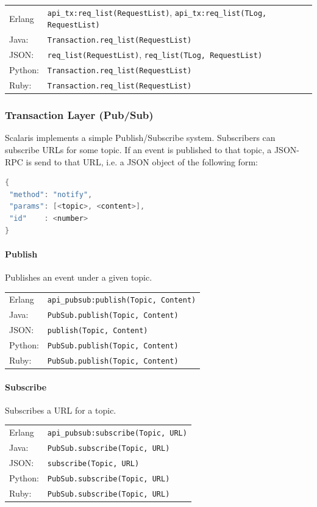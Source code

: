 \documentclass[a4paper]{scrreprt}
\newcommand{\code}[1]{\lstinline[basicstyle=\ttfamily]!#1!}
\begin{document}
\begin{tabular}{lp{14cm}}
Erlang  & \code{api_tx:req_list(RequestList)}, \code{api_tx:req_list(TLog, RequestList)}\\
Java:   & \code{Transaction.req_list(RequestList)}\\
JSON:   & \code{req_list(RequestList)}, \code{req_list(TLog, RequestList)}\\
Python: & \code{Transaction.req_list(RequestList)}\\
Ruby:   & \code{Transaction.req_list(RequestList)}
\end{tabular}

\subsubsection{Transaction Layer (Pub/Sub)}
Scalaris implements a simple Publish/Subscribe system. Subscribers can
subscribe URLs for some topic. If an event is published to that topic, a
JSON-RPC is send to that URL, i.e. a JSON object of the following form:
\begin{lstlisting}[language=java]
{
 "method": "notify",
 "params": [<topic>, <content>],
 "id"    : <number>
}
\end{lstlisting}

\paragraph{Publish}
Publishes an event under a given topic.

\begin{tabular}{lp{14cm}}
Erlang  & \code{api_pubsub:publish(Topic, Content)}\\
Java:   & \code{PubSub.publish(Topic, Content)}\\
JSON:   & \code{publish(Topic, Content)}\\
Python: & \code{PubSub.publish(Topic, Content)}\\
Ruby:   & \code{PubSub.publish(Topic, Content)}
\end{tabular}

\paragraph{Subscribe}
Subscribes a URL for a topic.

\begin{tabular}{lp{14cm}}
Erlang  & \code{api_pubsub:subscribe(Topic, URL)}\\
Java:   & \code{PubSub.subscribe(Topic, URL)}\\
JSON:   & \code{subscribe(Topic, URL)}\\
Python: & \code{PubSub.subscribe(Topic, URL)}\\
Ruby:   & \code{PubSub.subscribe(Topic, URL)}
\end{tabular}
\end{document}
